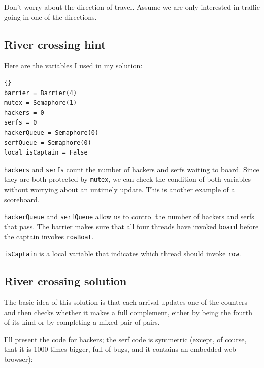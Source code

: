 \documentclass{book}
\newcommand{\clearemptydoublepage}{\newpage\cleardoublepage}
\begin{document}
Don't worry about the direction of travel.  Assume we are
only interested in traffic going in one of the directions.


\clearemptydoublepage
\subsection {River crossing hint}

Here are the variables I used in my solution:

\begin{latin}
\begin{latin}
\begin{lstlisting}[title={River crossing hint}]{}
barrier = Barrier(4)
mutex = Semaphore(1)
hackers = 0
serfs = 0
hackerQueue = Semaphore(0)
serfQueue = Semaphore(0)
local isCaptain = False
\end{lstlisting}
\end{latin}
\end{latin}

{\tt hackers} and {\tt serfs} count the number of hackers
and serfs waiting to board.  Since they are both protected by
{\tt mutex}, we can check the condition of both variables without
worrying about an untimely update.  This is another example
of a scoreboard.

{\tt hackerQueue} and {\tt serfQueue} allow us to control the number
of hackers and serfs that pass.  The barrier
makes sure that all four threads have invoked
{\tt board} before the captain invokes {\tt rowBoat}.

{\tt isCaptain} is a local variable that
indicates which thread should invoke {\tt row}.

\clearemptydoublepage
\subsection {River crossing solution}

The basic idea of this solution is that each arrival updates
one of the counters and then checks whether it makes a
full complement, either by being the fourth of its kind or
by completing a mixed pair of pairs.

I'll present the code for hackers; the serf code is
symmetric (except, of course, that it is 1000 times bigger,
full of bugs, and it contains an embedded web browser):
\end{document}
